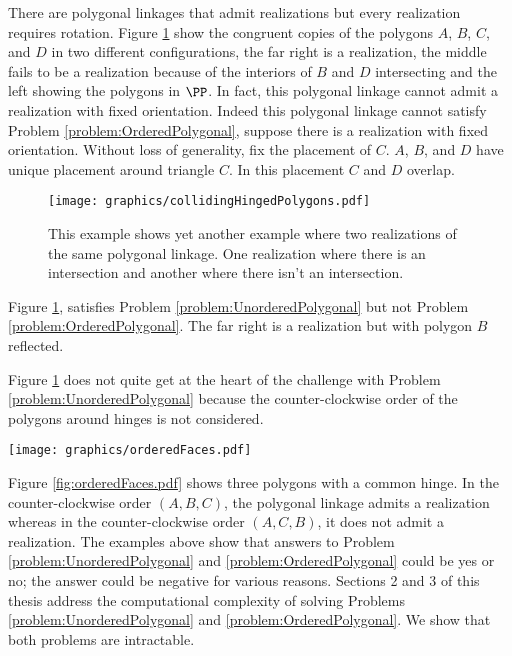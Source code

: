 \documentclass[10pt]{CSUNthesis}
\theoremstyle{plain}%
\theoremstyle{definition}
\theoremstyle{remark}
\begin{document}
There are polygonal linkages that admit realizations but every realization requires rotation.
Figure \ref{fig:collidingHingedPolygons} show the congruent copies of the polygons $A$, $B$, $C$, and $D$ in two different configurations, the far right is a realization, the middle fails to be a realization because of the interiors of $B$ and $D$ intersecting and the left showing the polygons in $\PP$.  
In fact, this polygonal linkage cannot admit a realization with fixed orientation.
Indeed this polygonal linkage cannot satisfy Problem \ref{problem:OrderedPolygonal}, suppose there is a realization with fixed orientation.  
Without loss of generality, fix the placement of $C$.
$A$, $B$, and $D$ have unique placement around triangle $C$.  
In this placement $C$ and $D$ overlap.
\begin{figure}[!htbp]\begin{center}
\texttt{[image: graphics/collidingHingedPolygons.pdf]}
\end{center} 
\caption{This example shows yet another example where two realizations of the same polygonal linkage. 
 One realization where there is an intersection and another where there isn't an intersection.}\label{fig:collidingHingedPolygons}
\end{figure}
Figure \ref{fig:collidingHingedPolygons}, satisfies Problem \ref{problem:UnorderedPolygonal} but not Problem \ref{problem:OrderedPolygonal}.
 The far right is a realization but with polygon $B$ reflected. 

Figure \ref{fig:collidingHingedPolygons} does not quite get at the heart of the challenge with Problem \ref{problem:UnorderedPolygonal} because the counter-clockwise order of the polygons around hinges is not considered.

\begin{minipage}{\linewidth}
\begin{center}
\texttt{[image: graphics/orderedFaces.pdf]}
\end{center}
\label{fig:orderedFaces.pdf}
\end{minipage}

Figure \ref{fig:orderedFaces.pdf} shows three polygons with a common hinge.
In the counter-clockwise order $(A,B,C)$, the polygonal linkage admits a realization whereas in the counter-clockwise order $(A,C,B)$, it does not admit a realization.
The examples above show that answers to Problem \ref{problem:UnorderedPolygonal} and \ref{problem:OrderedPolygonal} could be yes or no; the answer could be negative for various reasons.
Sections 2 and 3 of this thesis address the computational complexity of solving Problems \ref{problem:UnorderedPolygonal} and \ref{problem:OrderedPolygonal}.
We show that both problems are intractable.
\end{document}
